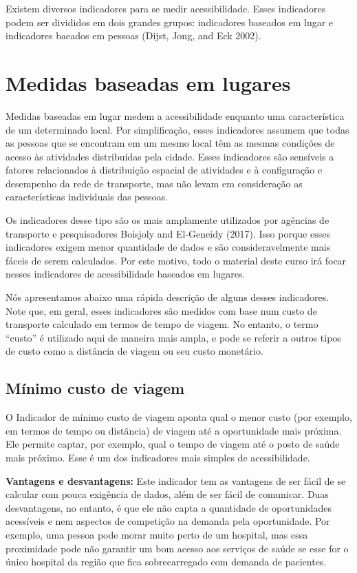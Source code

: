 \documentclass[
  letterpaper,
  DIV=11,
  numbers=noendperiod]{scrreprt}
\begin{document}
Existem diversos indicadores para se medir acessibilidade. Esses
indicadores podem ser divididos em dois grandes grupos: indicadores
baseados em lugar e indicadores baeados em pessoas (Dijst, Jong, and Eck
2002).

\hypertarget{medidas-baseadas-em-lugares}{%
\section{Medidas baseadas em
lugares}\label{medidas-baseadas-em-lugares}}

Medidas baseadas em lugar medem a acessibilidade enquanto uma
característica de um determinado local. Por simplificação, esses
indicadores assumem que todas as pessoas que se encontram em um mesmo
local têm as mesmas condições de acesso às atividades distribuídas pela
cidade. Esses indicadores são sensíveis a fatores relacionados à
distribuição espacial de atividades e à configuração e desempenho da
rede de transporte, mas não levam em consideração as características
individuais das pessoas.

Os indicadores desse tipo são os mais amplamente utilizados por agências
de transporte e pesquisadores Boisjoly and El-Geneidy (2017). Isso
porque esses indicadores exigem menor quantidade de dados e são
consideravelmente mais fáceis de serem calculados. Por este motivo, todo
o material deste curso irá focar nesses indicadores de acessibilidade
baseados em lugares.

Nós apresentamos abaixo uma rápida descrição de alguns desses
indicadores. Note que, em geral, esses indicadores são medidos com base
num custo de transporte calculado em termos de tempo de viagem. No
entanto, o termo ``custo'' é utilizado aqui de maneira mais ampla, e
pode se referir a outros tipos de custo como a distância de viagem ou
seu custo monetário.

\hypertarget{muxednimo-custo-de-viagem}{%
\subsection{Mínimo custo de viagem}\label{muxednimo-custo-de-viagem}}

O Indicador de mínimo custo de viagem aponta qual o menor custo (por
exemplo, em termos de tempo ou distância) de viagem até a oportunidade
mais próxima. Ele permite captar, por exemplo, qual o tempo de viagem
até o posto de saúde mais próximo. Esse é um dos indicadores mais
simples de acessibilidade.

\textbf{Vantagens e desvantagens:} Este indicador tem as vantagens de
ser fácil de se calcular com pouca exigência de dados, além de ser fácil
de comunicar. Duas desvantagens, no entanto, é que ele não capta a
quantidade de oportunidades acessíveis e nem aspectos de competição na
demanda pela oportunidade. Por exemplo, uma pessoa pode morar muito
perto de um hospital, mas essa proximidade pode não garantir um bom
acesso aos serviços de saúde se esse for o único hospital da região que
fica sobrecarregado com demanda de pacientes.
\end{document}
